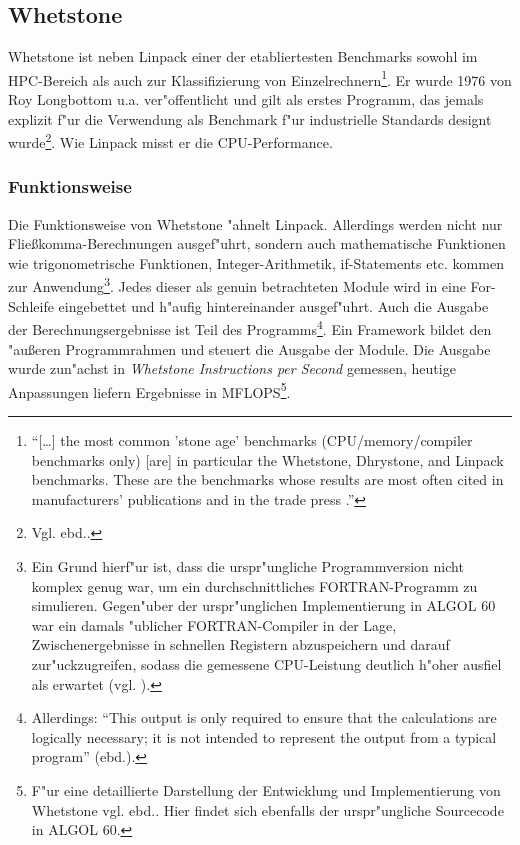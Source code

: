 \subsection{Whetstone}\label{Whetstone}

Whetstone ist neben Linpack einer der etabliertesten Benchmarks sowohl im HPC-Bereich als auch zur Klassifizierung von Einzelrechnern\footnote{"`[\dots] the most common 'stone age' benchmarks (CPU/memory/compiler benchmarks only) [are] in particular the Whetstone, Dhrystone, and Linpack benchmarks. These are the benchmarks whose results are most often cited in manufacturers' publications and in the trade press \cite{wei90}."'}. Er wurde 1976 von Roy Longbottom u.a. ver"offentlicht und gilt als erstes Programm, das jemals explizit f"ur die Verwendung als Benchmark f"ur industrielle Standards designt wurde\footnote{Vgl. ebd..}. Wie Linpack misst er die CPU-Performance. 

\subsubsection{Funktionsweise}\label{Funktionsweise Whetstone}

Die Funktionsweise von Whetstone "ahnelt Linpack. Allerdings werden nicht nur Flie\ss komma-Berechnungen ausgef"uhrt, sondern auch mathematische Funktionen wie trigonometrische Funktionen, Integer-Arithmetik, if-Statements etc. kommen zur Anwendung\footnote{Ein Grund hierf"ur ist, dass die urspr"ungliche Programmversion nicht komplex genug war, um ein durchschnittliches FORTRAN-Programm zu simulieren. Gegen"uber der urspr"unglichen Implementierung in ALGOL 60 war ein damals "ublicher FORTRAN-Compiler in der Lage, Zwischenergebnisse in schnellen Registern abzuspeichern und darauf zur"uckzugreifen, sodass die gemessene CPU-Leistung deutlich h"oher ausfiel als erwartet (vgl. \cite{cur76}).}. Jedes dieser als genuin betrachteten Module wird in eine For-Schleife eingebettet und h"aufig hintereinander ausgef"uhrt. Auch die Ausgabe der Berechnungsergebnisse ist Teil des Programms\footnote{Allerdings: "`This output is only required to ensure that the calculations are logically necessary; it is not intended to represent the output from a typical program"' (ebd.).}. Ein Framework bildet den "au\ss eren Programmrahmen und steuert die Ausgabe der Module. Die Ausgabe wurde zun"achst in \textit{Whetstone Instructions per Second} gemessen, heutige Anpassungen liefern Ergebnisse in MFLOPS\footnote{F"ur eine detaillierte Darstellung der Entwicklung und Implementierung von Whetstone vgl. ebd.. Hier findet sich ebenfalls der urspr"ungliche Sourcecode in ALGOL 60.}. 

